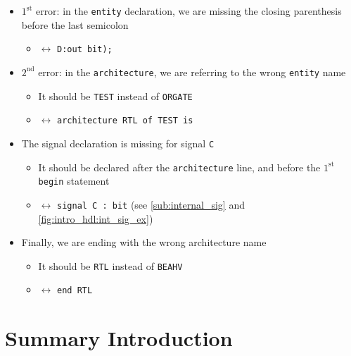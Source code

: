 \begin{itemize}

\item $\mathrm{1}^\mathrm{st}$ error: in the \verb|entity| declaration, we are missing the closing parenthesis before the last semicolon 

	\begin{itemize}
	\item $\leftrightarrow$ \verb|D:out bit);|
	\end{itemize}



\item $\mathrm{2}^\mathrm{nd}$ error: in the \verb|architecture|, we are referring to the wrong \verb|entity| name

	\begin{itemize}
	\item It should be \verb|TEST| instead of \verb|ORGATE| 
	
    \item $\leftrightarrow$ \verb|architecture RTL of TEST is|
	
	\end{itemize}

\item The signal declaration is missing for signal \verb|C|

	\begin{itemize}
	\item It should be declared after the \verb|architecture| line, and before the $\mathrm{1}^\mathrm{st}$ \verb|begin| statement
	
	\item $\leftrightarrow$ \verb|signal C : bit| (see \ref{sub:internal_sig} and \autoref{fig:intro_hdl:int_sig_ex})
	\end{itemize}

\item Finally, we are ending with the wrong architecture name

	\begin{itemize}
	\item It should be \verb|RTL| instead of \verb|BEAHV|
	
	\item $\leftrightarrow$ \verb|end RTL|
	\end{itemize}

\end{itemize}



\newpage
\section{Summary Introduction}

